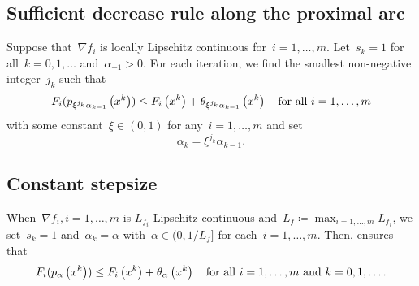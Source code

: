 \documentclass[../main]{subfiles}
\begin{document}
\subsection{Sufficient decrease rule along the proximal arc} 
Suppose that~$\nabla f_i$ is locally Lipschitz continuous for~$i = 1, \dots, m$.
Let~$s_k = 1$ for all~$k = 0, 1, \dots$ and~$\alpha_{-1} > 0$.
For each iteration, we find the smallest non-negative integer~$j_k$ such that
\begin{equation} \label{eq:pgm_sdc}
    F_i(p_{\xi^{j_k} \alpha_{k - 1}}\left(x^k\right)) \le F_i\left(x^k\right) + \theta_{\xi^{j_k} \alpha_{k - 1}}\left(x^k\right) \quad \text{for all~$i = 1, \dots, m$}
\end{equation}
with some constant~$\xi \in (0, 1)$ for any~$i = 1, \dots, m$ and set
\begin{equation} \label{eq:pgm_sdc_step}
    \alpha_k = \xi^{j_k} \alpha_{k - 1}
    .\end{equation}

\subsection{Constant stepsize} 
When~$\nabla f_i, i = 1, \dots, m$ is $L_{f_i}$-Lipschitz continuous and~$L_f \coloneqq \max_{i = 1, \dots, m} L_{f_i}$, we set~$s_k = 1$ and~$\alpha_k = \alpha$ with~$\alpha \in (0, 1 / L_f]$ for each~$i = 1, \dots, m$.
Then,  ensures that
\begin{equation} \label{eq:pgm_constant}
    F_i(p_\alpha\left(x^k\right)) \le F_i\left(x^k\right) + \theta_\alpha\left(x^k\right) \quad \text{for all~$i = 1, \dots, m \text{ and } k = 0, 1, \dots$}
    .\end{equation}
\end{document}
